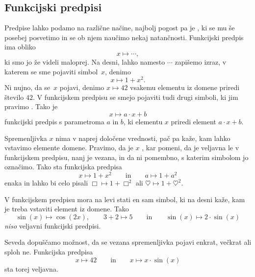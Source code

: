 \subsection{Funkcijski predpisi}
\label{sec:funkcijski-predpisi}

Predpise lahko podamo na različne načine, najbolj pogost pa je , ki
se mu še posebej posvetimo in se ob njem naučimo nekaj natančnosti. Funkcijski predpis ima
obliko
%
\begin{equation*}
  x \mapsto \cdots,
\end{equation*}
%
ki smo jo že videli maloprej. Na desni, lahko namesto $\cdots$ zapišemo izraz, v katerem
se sme pojaviti simbol~$x$, denimo
%
\begin{equation*}
  x \mapsto 1 + x^2.
\end{equation*}
%
Ni nujno, da se~$x$ pojavi, denimo $x \mapsto 42$ vsakemu elementu iz domene priredi
število $42$. V funkcijskem predpisu se smejo pojaviti tudi drugi simboli, ki jim
pravimo . Tako je
%
\begin{equation*}
  x \mapsto a \cdot x + b
\end{equation*}
%
funkcijski predpis s parametroma $a$ in $b$, ki elementu $x$ priredi element $a \cdot x + b$.

Spremenljivka $x$ nima v naprej določene vrednosti, pač pa kaže, kam lahko vstavimo
elemente domene. Pravimo, da je $x$ , kar pomeni, da je veljavna
le v funkcijskem predpisu, nanj je vezana, in da ni pomembno, s katerim simbolom jo
označimo. Tako sta funkcijska predpisa
%
\begin{equation*}
  x \mapsto 1 + x^2
  \qquad\text{in}\qquad
  a \mapsto 1 + a^2
\end{equation*}
%
enaka in lahko bi celo pisali $\Box \mapsto 1 + \Box^2$ ali
$\heartsuit \mapsto 1 + \heartsuit^2$.

V funkcijskem predpisu mora na levi stati en sam simbol, ki na desni kaže, kam je treba
vstaviti element iz domene. Tako
%
\begin{equation*}
  \sin(x) \mapsto \cos(2 x),
  \qquad
  3 + 2 \mapsto 5
  \qquad\text{in}\qquad
  \sin(x) \mapsto 2 \cdot \sin(x)
\end{equation*}
%
\emph{niso} veljavni funkcijski predpisi.

Seveda dopuščamo možnost, da se vezana spremenljivka pojavi enkrat, večkrat ali sploh ne.
Funkcijska predpisa
%
%
\begin{equation*}
  x \mapsto 42
  \qquad\text{in}\qquad
  x \mapsto x \cdot \sin(x)
\end{equation*}
%
sta torej veljavna.

